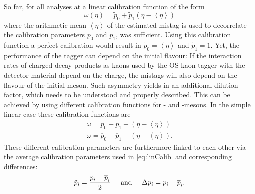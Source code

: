 So far, for all analyses at \lhcb a linear calibration function of the form
\begin{equation}
\omega(\eta)=\tilde{p}_0+\tilde{p}_1\left(\eta-\left<\eta\right>\right)\label{eq:linCalib}
\end{equation}
where the arithmetic mean $\left<\eta\right>$ of the estimated mistag is used to decorrelate the calibration parameters $p_0$ and $p_1$, was sufficient.
Using this calibration function a perfect calibration would result in $\tilde{p}_0=\left<\eta\right>$ and $\tilde{p}_1=1$.
Yet, the performance of the tagger can depend on the initial \B flavour:
If the interaction rates of charged decay products as kaons used by the OS kaon tagger with the detector material depend on the charge, the mistags will also depend on the flavour of the initial \B meson.
Such asymmetry yields in an additional dilution factor, which needs to be understood and properly described.
This can be achieved by using different calibration functions for \Bz- and \Bzb-mesons.
In the simple linear case these calibration functions are
\begin{equation}
\begin{aligned}
\omega=p_0+p_1+\left(\eta-\left<\eta\right>\right)\\
\overline{\omega}=\overline{p}_0+\overline{p}_1+\left(\eta-\left<\eta\right>\right).
\end{aligned}
\end{equation}
These different calibration parameters are furthermore linked to each other via the average calibration parameters used in \cref{eq:linCalib} and corresponding differences:
\begin{equation}
\tilde{p}_i=\frac{p_i+\overline{p}_i}{2}\hspace{0.5cm}\text{and}\hspace{0.5cm}\Delta p_i=p_i-\overline{p}_i.
\end{equation}


